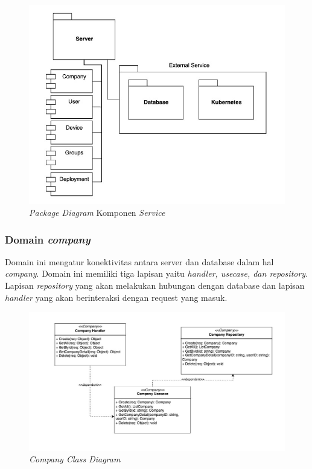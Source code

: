 \begin{figure}[ht]
  \centering
  \includegraphics[width=1\textwidth]{resources/chapter-3/package-backend-diagram.jpg}
  \caption{\textit{Package Diagram} Komponen \textit{Service}}
  \label{fig:package-diagram-backend}
\end{figure}

\subsubsection{Domain \textit{company}}

Domain ini mengatur konektivitas antara server dan database dalam hal \textit{company}. Domain ini memiliki tiga lapisan yaitu \textit{handler, usecase, dan repository}. Lapisan \textit{repository} yang akan melakukan hubungan dengan database dan lapisan \textit{handler} yang akan berinteraksi dengan request yang masuk.

\begin{figure}[ht]
  \centering
  \includegraphics[width=1\textwidth]{resources/chapter-3/class/company-class-diagram.jpg}
  \caption{\textit{Company Class Diagram}}
  \label{fig:company-class-diagram}
\end{figure}

